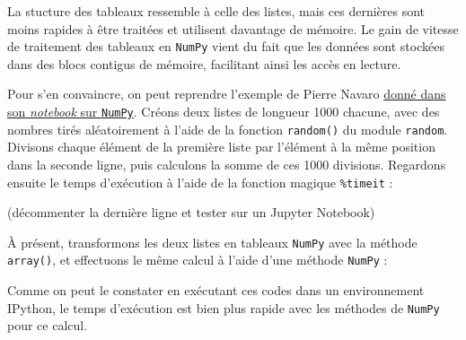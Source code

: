 \documentclass[12pt,]{book}
\newenvironment{Shaded}{\begin{snugshade}}{\end{snugshade}}
\newcommand{\KeywordTok}[1]{\textcolor[rgb]{0.13,0.29,0.53}{\textbf{#1}}}
\newcommand{\DecValTok}[1]{\textcolor[rgb]{0.00,0.00,0.81}{#1}}
\newcommand{\ImportTok}[1]{#1}
\newcommand{\CommentTok}[1]{\textcolor[rgb]{0.56,0.35,0.01}{\textit{#1}}}
\newcommand{\ControlFlowTok}[1]{\textcolor[rgb]{0.13,0.29,0.53}{\textbf{#1}}}
\newcommand{\OperatorTok}[1]{\textcolor[rgb]{0.81,0.36,0.00}{\textbf{#1}}}
\newcommand{\BuiltInTok}[1]{#1}
\newcommand{\NormalTok}[1]{#1}
\numberwithin{equation}{section}
\numberwithin{countremarque}{section}
\begin{document}
La stucture des tableaux ressemble à celle des listes, mais ces
dernières sont moins rapides à être traitées et utilisent davantage de
mémoire. Le gain de vitesse de traitement des tableaux en \texttt{NumPy}
vient du fait que les données sont stockées dans des blocs contigus de
mémoire, facilitant ainsi les accès en lecture.

Pour s'en convaincre, on peut reprendre l'exemple de Pierre Navaro
\href{https://github.com/pnavaro/python-notebooks/blob/master/13.Numpy.ipynb}{donné
dans son \emph{notebook} sur \texttt{NumPy}}. Créons deux listes de
longueur 1000 chacune, avec des nombres tirés aléatoirement à l'aide de
la fonction \texttt{random()} du module \texttt{random}. Divisons chaque
élément de la première liste par l'élément à la même position dans la
seconde ligne, puis calculons la somme de ces 1000 divisions. Regardons
ensuite le temps d'exécution à l'aide de la fonction magique
\texttt{\%timeit} :

\begin{Shaded}
\end{Shaded}

(décommenter la dernière ligne et tester sur un Jupyter Notebook)

À présent, transformons les deux listes en tableaux \texttt{NumPy} avec
la méthode \texttt{array()}, et effectuons le même calcul à l'aide d'une
méthode \texttt{NumPy} :

\begin{Shaded}
\end{Shaded}

Comme on peut le constater en exécutant ces codes dans un environnement
IPython, le temps d'exécution est bien plus rapide avec les méthodes de
\texttt{NumPy} pour ce calcul.
\end{document}

